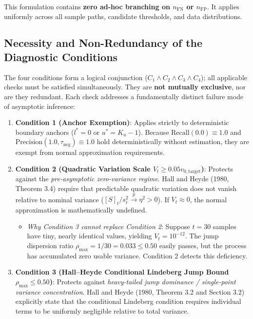 \documentclass[11pt,a4paper]{article}
\begin{document}
This formulation contains \textbf{zero ad-hoc branching on $n_{\text{FN}}$ or $n_{\text{FP}}$}. It applies uniformly across all sample paths, candidate thresholds, and data distributions.

\subsection{Necessity and Non-Redundancy of the Diagnostic Conditions}
The four conditions form a logical conjunction ($C_1 \land C_2 \land C_3 \land C_4$); all applicable checks must be satisfied simultaneously. They are \textbf{not mutually exclusive}, nor are they redundant. Each check addresses a fundamentally distinct failure mode of asymptotic inference:

\begin{enumerate}[leftmargin=*]
    \item \textbf{Condition 1 (Anchor Exemption)}: Applies strictly to deterministic boundary anchors ($l^* = 0$ or $u^* = K_u - 1$). Because $\text{Recall}(0.0) \equiv 1.0$ and $\text{Precision}(1.0, \tau_{\text{neg}}) \equiv 1.0$ hold deterministically without estimation, they are exempt from normal approximation requirements.
    \item \textbf{Condition 2 (Quadratic Variation Scale $V_t \ge 0.05 v_{0, \text{target}}$)}: Protects against the \emph{pre-asymptotic zero-variance regime}. Hall and Heyde (1980, Theorem 3.4) require that predictable quadratic variation does not vanish relative to nominal variance ($[S]_t / s_t^2 \xrightarrow{p} \eta^2 > 0$). If $V_t \approx 0$, the normal approximation is mathematically undefined.
    \begin{itemize}
        \item \emph{Why Condition 3 cannot replace Condition 2}: Suppose $t = 30$ samples have tiny, nearly identical values, yielding $V_t = 10^{-12}$. The jump dispersion ratio $\rho_{\max} = 1/30 = 0.033 \le 0.50$ easily passes, but the process has accumulated zero usable variance. Condition 2 detects this deficiency.
    \end{itemize}
    \item \textbf{Condition 3 (Hall--Heyde Conditional Lindeberg Jump Bound $\rho_{\max} \le 0.50$)}: Protects against \emph{heavy-tailed jump dominance / single-point variance concentration}. Hall and Heyde (1980, Theorem 3.2 and Section 3.2) explicitly state that the conditional Lindeberg condition requires individual terms to be uniformly negligible relative to total variance.
    \begin{itemize}

\end{itemize}
\end{enumerate}
\end{document}
